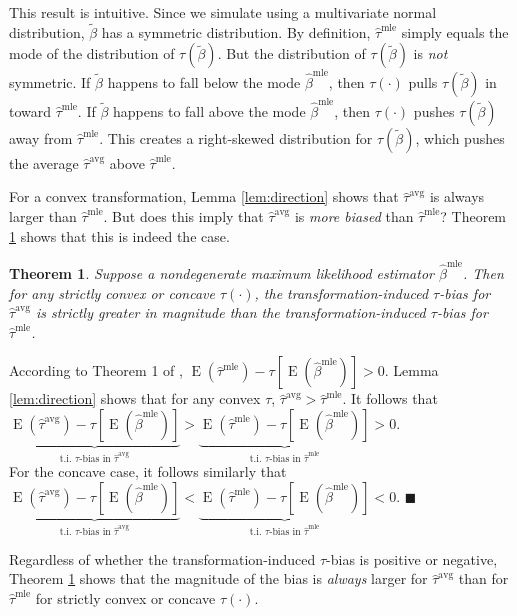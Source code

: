 \documentclass[11pt]{article}
\newtheorem{theorem}{Theorem}
\newenvironment{proof}[1][Proof]{\begin{trivlist}
\item[\hskip \labelsep {\bfseries #1}]}{\end{trivlist}}
\DeclareMathOperator*{\E}{\text{E}}
\begin{document}
\noindent This result is intuitive. Since we simulate using a multivariate normal distribution, $\tilde{\beta}$ has a symmetric distribution. By definition, $\hat{\tau}^\text{mle}$ simply equals the mode of the distribution of $\tau(\tilde{\beta})$. But the distribution of $\tau(\tilde{\beta})$ is \emph{not} symmetric. If $\tilde{\beta}$ happens to fall below the mode $\hat{\beta}^\text{mle}$, then $\tau(\cdot)$ pulls $\tau(\tilde{\beta})$ in toward $\hat{\tau}^\text{mle}$. If $\tilde{\beta}$ happens to fall above the mode $\hat{\beta}^\text{mle}$, then $\tau(\cdot)$ pushes $\tau(\tilde{\beta})$ away from $\hat{\tau}^\text{mle}$. This creates a right-skewed distribution for $\tau(\tilde{\beta})$, which pushes the average $\hat{\tau}^\text{avg}$ above $\hat{\tau}^\text{mle}$.

For a convex transformation, Lemma \ref{lem:direction} shows that $\hat{\tau}^\text{avg}$ is always larger than $\hat{\tau}^\text{mle}$.
But does this imply that $\hat{\tau}^\text{avg}$ is \textit{more biased} than $\hat{\tau}^\text{mle}$? Theorem \ref{thm:direction} shows that this is indeed the case.

\begin{theorem}\label{thm:direction}
Suppose a nondegenerate maximum likelihood estimator $\hat{\beta}^\text{mle}$. Then for any strictly convex or concave $\tau(\cdot)$, the transformation-induced $\tau$-bias for $\hat{\tau}^{\text{avg}}$ is strictly greater in magnitude than the transformation-induced $\tau$-bias for $\hat{\tau}^{\text{mle}}$.
\end{theorem}
\begin{proof}
According to Theorem 1 of \citet[p. 405]{Rainey2017}, $\E \left( \hat{\tau}^\text{mle}\right) -  \tau \left[\E \left( \hat{\beta}^\text{mle} \right) \right] > 0$.
Lemma \ref{lem:direction} shows that for any convex $\tau$, $\hat{\tau}^{\text{avg}} > \hat{\tau}^\text{mle}$. It follows that $\underbrace{\E \left( \hat{\tau}^\text{avg}\right) - \tau \left[\E \left( \hat{\beta}^\text{mle} \right) \right]}_{\text{t.i. } \tau\text{-bias in }\hat{\tau}^{\text{avg}}} > \underbrace{\E \left( \hat{\tau}^\text{mle}\right) -  \tau \left[\E \left( \hat{\beta}^\text{mle} \right) \right]}_{\text{t.i. } \tau\text{-bias in }\hat{\tau}^{\text{mle}}} > 0$.\\

\noindent For the concave case, it follows similarly that $\underbrace{\E \left( \hat{\tau}^\text{avg}\right) - \tau \left[\E \left( \hat{\beta}^\text{mle} \right) \right]}_{\text{t.i. } \tau\text{-bias in }\hat{\tau}^{\text{avg}}} < \underbrace{\E \left( \hat{\tau}^\text{mle}\right) -  \tau \left[\E \left( \hat{\beta}^\text{mle} \right) \right]}_{\text{t.i. } \tau\text{-bias in }\hat{\tau}^{\text{mle}}} < 0$.
 $\blacksquare$
\end{proof}
Regardless of whether the transformation-induced $\tau$-bias is positive or negative, Theorem \ref{thm:direction} shows that the magnitude of the bias is \textit{always} larger for $\hat{\tau}^{\text{avg}}$ than for  $\hat{\tau}^{\text{mle}}$ for strictly convex or concave $\tau(\cdot)$.
\end{document}
